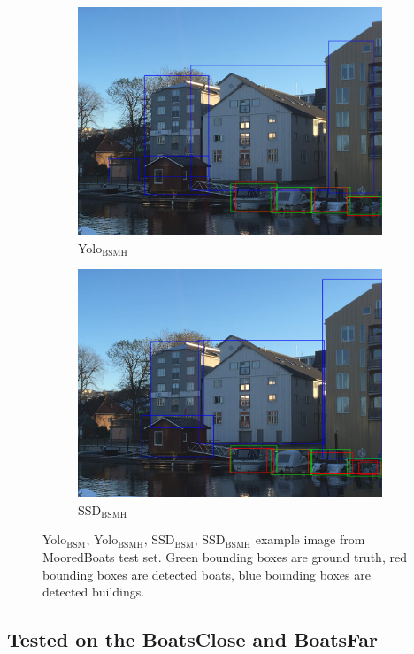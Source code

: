 \begin{figure}[h!]
\begin{subfigure}{.5\textwidth}
  \centering
  \includegraphics[width=0.8\linewidth]{results/case_buildings/prec_recall/yolo/IMG_2077_build.jpg}
  \caption{Yolo$_{\text{BSMH}}$}
  \label{fig:ex_bbnb_yolo3}
\end{subfigure}%
\begin{subfigure}{.5\textwidth}
  \centering
  \includegraphics[width=.8\linewidth]{results/case_buildings/prec_recall/ssd/IMG_2077_build.jpg}
  \caption{SSD$_{\text{BSMH}}$}
  \label{fig:ex_bbnb_ssd3}
\end{subfigure}
\caption{Yolo$_{\text{BSM}}$, Yolo$_{\text{BSMH}}$, SSD$_{\text{BSM}}$, SSD$_{\text{BSMH}}$ example image from MooredBoats test set. Green bounding boxes are ground truth, red bounding boxes are detected boats, blue bounding boxes are detected buildings.}
\label{img:bbnb_ex}
\end{figure}

\newpage

\subsection{Tested on the BoatsClose and BoatsFar}

